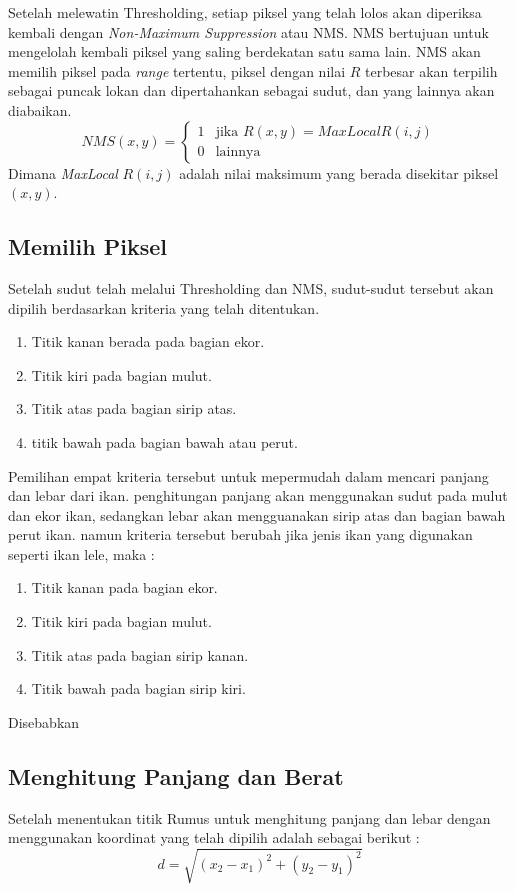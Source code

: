     Setelah melewatin Thresholding, setiap piksel yang telah lolos akan diperiksa kembali dengan \emph{Non-Maximum Suppression} atau NMS.
NMS bertujuan untuk mengelolah kembali piksel yang saling berdekatan satu sama lain. NMS akan memilih piksel pada \emph{range} tertentu, piksel dengan nilai \(R\) terbesar akan terpilih sebagai puncak lokan dan dipertahankan sebagai sudut, dan yang lainnya akan diabaikan.
\begin{equation*}
    NMS(x,y) =
    \begin{cases}
        1 & \text{jika } R(x,y) = MaxLocal R(i,j) \\
        0 & \text{lainnya }
    \end{cases}
\end{equation*}
Dimana \emph{MaxLocal} \(R(i,j)\) adalah nilai maksimum yang berada disekitar piksel \((x,y)\).

\subsection{Memilih Piksel}
    Setelah sudut telah melalui Thresholding dan NMS, sudut-sudut tersebut akan dipilih berdasarkan kriteria yang telah ditentukan.
\begin{enumerate}
    \item Titik kanan berada pada bagian ekor.
    \item Titik kiri pada bagian mulut.
    \item Titik atas pada bagian sirip atas.
    \item titik bawah pada bagian bawah atau perut.
\end{enumerate}

Pemilihan empat kriteria tersebut untuk mepermudah dalam mencari panjang dan lebar dari ikan. penghitungan panjang akan menggunakan sudut pada mulut dan ekor ikan, sedangkan lebar akan mengguanakan sirip atas dan bagian bawah perut ikan. 
namun kriteria tersebut berubah jika jenis ikan yang digunakan seperti ikan lele, maka :
\begin{enumerate}
    \item Titik kanan pada bagian ekor.
    \item Titik kiri pada bagian mulut.
    \item Titik atas pada bagian sirip kanan.
    \item Titik bawah pada bagian sirip kiri.
\end{enumerate}
    Disebabkan


\subsection{Menghitung Panjang dan Berat}
    Setelah menentukan titik Rumus untuk menghitung panjang dan lebar dengan menggunakan koordinat yang telah dipilih adalah sebagai berikut :
\begin{equation}
    d = \sqrt{(x_2 - x_1)^2 + (y_2 - y_1)^2}
\end{equation}    
    
